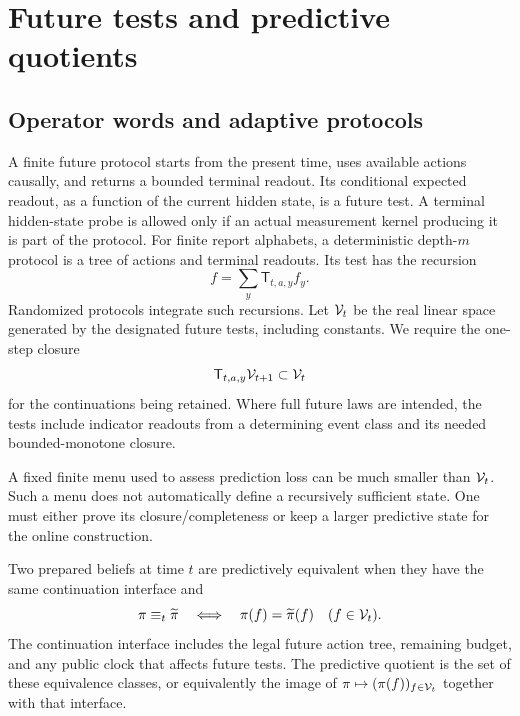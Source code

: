 \section{Future tests and predictive quotients}\label{sec:quotients}
\subsection{Operator words and adaptive protocols}
A finite future protocol starts from the present time, uses available
actions causally, and returns a bounded terminal readout. Its conditional
expected readout, as a function of the current hidden state, is a future
test. A terminal hidden-state probe is allowed only if an actual measurement
kernel producing it is part of the protocol. For finite report alphabets,
a deterministic depth-$m$ protocol is a tree of actions and terminal
readouts. Its test has the recursion
\begin{equation}\label{eq:test-tree}
 f=\sum_y\mathsf T_{t,a,y}f_y.
\end{equation}
Randomized protocols integrate such recursions. Let $\mathcal V_t$ be the real
linear space generated by the designated future tests, including constants.
We require the one-step closure
\begin{equation}\label{eq:closure}
 \mathsf T_{t,a,y}\mathcal V_{t+1}\subset\mathcal V_t
\end{equation}
for the continuations being retained. Where full future laws are intended,
the tests include indicator readouts from a determining event class and
its needed bounded-monotone closure.

A fixed finite menu used to assess prediction loss can be much smaller than
$\mathcal V_t$. Such a menu does not automatically define a recursively sufficient
state. One must either prove its closure/completeness or keep a larger
predictive state for the online construction.

\begin{definition}\label{def:predictive-equivalence}
Two prepared beliefs at time $t$ are predictively equivalent when they have
the same continuation interface and
\[
 \pi\equiv_t\widetilde\pi
 \quad\Longleftrightarrow\quad
 \pi(f)=\widetilde\pi(f)\quad(f\in\mathcal V_t).
\]
The continuation interface includes the legal future action tree, remaining
budget, and any public clock that affects future tests. The predictive
quotient is the set of these equivalence classes, or equivalently the image
of $\pi\mapsto(\pi(f))_{f\in\mathcal V_t}$ together with that interface.
\end{definition}

